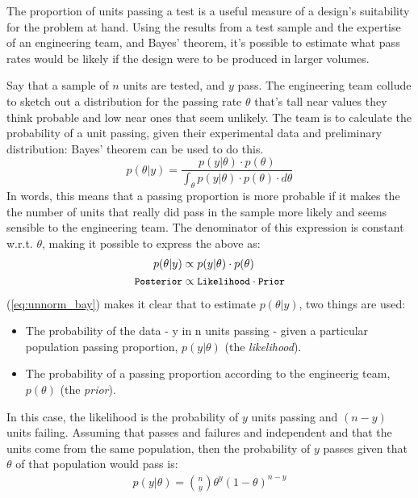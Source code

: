 \documentclass[11pt,a4paper,article]{memoir} %
\begin{document}
\par
The proportion of units passing a test is a useful measure of a design's suitability for the problem at hand. Using the results from a test sample and the expertise of an engineering team, and Bayes' theorem, it's possible to estimate what pass rates would be likely if the design were to be produced in larger volumes.
\par
Say that a sample of $n$ units are tested, and $y$ pass. The engineering team collude to sketch out a distribution for the passing rate $\theta$ that's tall near values they think probable and low near ones that seem unlikely. The team is to calculate the probability of a unit passing, given their experimental data and preliminary distribution: Bayes' theorem can be used to do this.
\begin{equation}
  p(\theta|y) = \frac{p(y|\theta)\cdot p(\theta)}{\int_{\theta}p(y|\theta)\cdot p(\theta)\cdot d\theta}
  \label{eq:bayes}
\end{equation}
In words, this means that a passing proportion is more probable if it makes the the number of units that really did pass in the sample more likely and seems sensible to the engineering team. The denominator of this expression is constant w.r.t. $\theta$, making it possible to express the above as:
\begin{align}
  p(\theta|y) &\propto p(y | \theta)\cdot p(\theta)   \label{eq:unnorm_bay} \\
  \small{\texttt{Posterior}} &\propto\small{{\texttt{Likelihood} \cdot \texttt{Prior}}} \nonumber
\end{align}
(\ref{eq:unnorm_bay}) makes it clear that to estimate $p(\theta|y)$, two things are used:
\begin{itemize}
\item The probability of the data - y in n units passing - given a particular population passing proportion, $p(y|\theta)$ (the \emph{likelihood}).
\item  The probability of a passing proportion according to the engineerig team, $p(\theta)$ (the \emph{prior}).
\end{itemize}
In this case, the likelihood is the probability of $y$ units passing and $(n-y)$ units failing. Assuming that passes and failures and independent and that the units come from the same population, then the probability of $y$ passes given that $\theta$ of that population would pass is:
\begin{gather}
  p(y|\theta) = \binom{n}{y} \theta^y (1 - \theta)^{n - y}
  \label{eq:binom_likelihood}
\end{gather}
\end{document}
